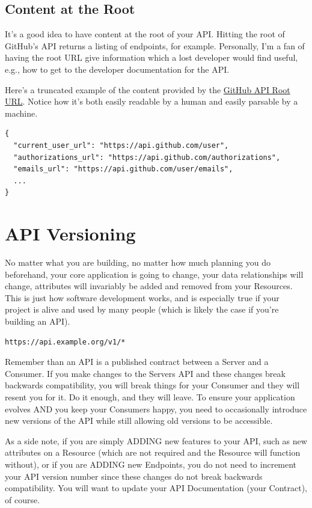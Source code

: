 \documentclass{book}
\begin{document}
\section{Content at the Root}

It's a good idea to have content at the root of your API. Hitting the root of GitHub's API returns a listing of endpoints, for example. Personally, I'm a fan of having the root URL give information which a lost developer would find useful, e.g., how to get to the developer documentation for the API.

Here's a truncated example of the content provided by the \href{https://api.github.com/}{GitHub API Root URL}. Notice how it's both easily readable by a human and easily parsable by a machine.

\begin{verbatim}
{
  "current_user_url": "https://api.github.com/user",
  "authorizations_url": "https://api.github.com/authorizations",
  "emails_url": "https://api.github.com/user/emails",
  ...
}
\end{verbatim}


\chapter{API Versioning}

No matter what you are building, no matter how much planning you do beforehand, your core application is going to change, your data relationships will change, attributes will invariably be added and removed from your Resources. This is just how software development works, and is especially true if your project is alive and used by many people (which is likely the case if you're building an API).

\begin{verbatim}
https://api.example.org/v1/*
\end{verbatim}

Remember than an API is a published contract between a Server and a Consumer. If you make changes to the Servers API and these changes break backwards compatibility, you will break things for your Consumer and they will resent you for it. Do it enough, and they will leave. To ensure your application evolves AND you keep your Consumers happy, you need to occasionally introduce new versions of the API while still allowing old versions to be accessible.

As a side note, if you are simply ADDING new features to your API, such as new attributes on a Resource (which are not required and the Resource will function without), or if you are ADDING new Endpoints, you do not need to increment your API version number since these changes do not break backwards compatibility. You will want to update your API Documentation (your Contract), of course.
\end{document}
